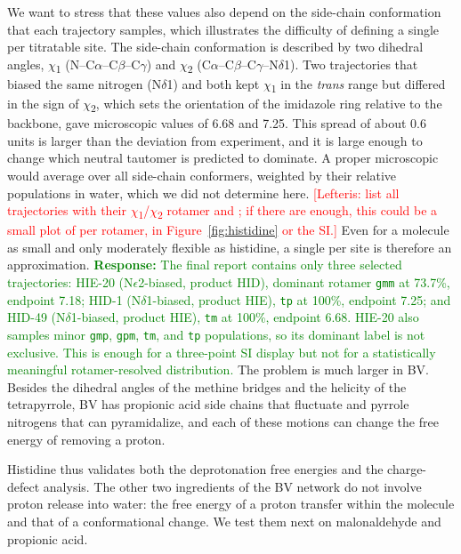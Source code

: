 We want to stress that these \pka{} values also depend on the side-chain conformation that each trajectory samples, which illustrates the difficulty of defining a single \pka{} per titratable site.
The side-chain conformation is described by two dihedral angles, $\chi$\textsubscript{1} (N--C$\alpha$--C$\beta$--C$\gamma$) and $\chi$\textsubscript{2} (C$\alpha$--C$\beta$--C$\gamma$--N$\delta$1).
Two trajectories that biased the same nitrogen (N$\delta$1) and both kept $\chi$\textsubscript{1} in the \emph{trans} range but differed in the sign of $\chi$\textsubscript{2}, which sets the orientation of the imidazole ring relative to the backbone, gave microscopic \pka{} values of 6.68 and 7.25.
This spread of about 0.6 units is larger than the deviation from experiment, and it is large enough to change which neutral tautomer is predicted to dominate.
A proper microscopic \pka{} would average over all side-chain conformers, weighted by their relative populations in water, which we did not determine here. \textcolor{red}{[Lefteris: list all trajectories with their $\chi$\textsubscript{1}/$\chi$\textsubscript{2} rotamer and \pka{}; if there are enough, this could be a small plot of \pka{} per rotamer, in Figure~\ref{fig:histidine} or the SI.]} Even for a molecule as small and only moderately flexible as histidine, a single \pka{} per site is therefore an approximation.
\textcolor{green}{\textbf{Response:} The final report contains only three selected trajectories: HIE-20 (N$\epsilon$2-biased, product HID), dominant rotamer \texttt{gmm} at 73.7\%, endpoint \pka{} 7.18; HID-1 (N$\delta$1-biased, product HIE), \texttt{tp} at 100\%, endpoint \pka{} 7.25; and HID-49 (N$\delta$1-biased, product HIE), \texttt{tm} at 100\%, endpoint \pka{} 6.68. HIE-20 also samples minor \texttt{gmp}, \texttt{gpm}, \texttt{tm}, and \texttt{tp} populations, so its dominant label is not exclusive. This is enough for a three-point SI display but not for a statistically meaningful rotamer-resolved \pka{} distribution.}
The problem is much larger in BV.
Besides the dihedral angles of the methine bridges and the helicity of the tetrapyrrole, BV has propionic acid side chains that fluctuate and pyrrole nitrogens that can pyramidalize, and each of these motions can change the free energy of removing a proton.

Histidine thus validates both the deprotonation free energies and the charge-defect analysis.
The other two ingredients of the BV network do not involve proton release into water: the free energy of a proton transfer within the molecule and that of a conformational change.
We test them next on malonaldehyde and propionic acid.

